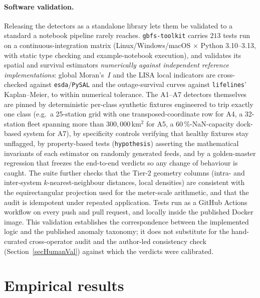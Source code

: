\documentclass[11pt,a4paper]{article}
\begin{document}
\paragraph{Software validation.}
Releasing the detectors as a standalone library lets them be validated to
a standard a notebook pipeline rarely reaches. \texttt{gbfs-toolkit}
carries $213$ tests run on a continuous-integration matrix
(Linux/Windows/macOS $\times$ Python 3.10--3.13, with static type
checking and example-notebook execution), and validates its spatial and
survival estimators \emph{numerically against independent reference
implementations}: global Moran's~$I$ and the LISA local indicators are
cross-checked against \texttt{esda}/\texttt{PySAL} and the
outage-survival curves against \texttt{lifelines}' Kaplan--Meier, to
within numerical tolerance. The A1--A7 detectors themselves are pinned by
deterministic per-class synthetic fixtures engineered to trip exactly one
class (e.g.\ a 25-station grid with one transposed-coordinate row for A4,
a 32-station fleet spanning more than $300{,}000$\,km$^2$ for A5, a
$60\,\%$-NaN-capacity dock-based system for A7), by specificity controls
verifying that healthy fixtures stay unflagged, by property-based tests
(\texttt{hypothesis}) asserting the mathematical invariants of each
estimator on randomly generated feeds, and by a golden-master regression
that freezes the end-to-end verdicts so any change of behaviour is
caught. The suite further checks that the Tier-2 geometry columns (intra-
and inter-system $k$-nearest-neighbour distances, local densities) are
consistent with the equirectangular projection used for the meter-scale
arithmetic, and that the audit is idempotent under repeated application.
Tests run as a GitHub Actions workflow on every push and pull request,
and locally inside the published Docker image. This validation
establishes the correspondence between the implemented logic and the
published anomaly taxonomy; it does not substitute for the hand-curated
cross-operator audit and the author-led consistency check
(Section~\ref{secHumanVal}) against which the verdicts were calibrated.


\section{Empirical results}\label{secResults}
\end{document}
